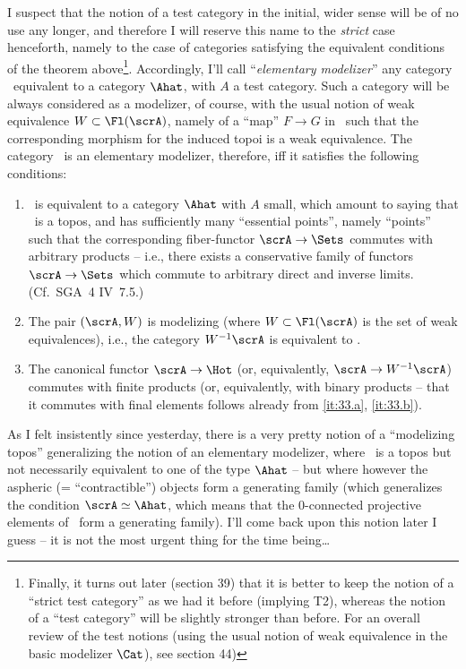 I suspect that the notion of a test category in the initial, wider
sense will be of no use any longer, and therefore I will reserve this
name to the \emph{strict} case henceforth, namely to the
case of categories satisfying the equivalent conditions of the theorem
above\footnote{Finally, it turns out later (section 39) that it is better to keep the notion of a ``strict test category'' as we had it before (implying T2), whereas the notion of a ``test category'' will be slightly stronger than before. For an overall review of the test notions (using the usual notion of weak equivalence in the basic modelizer $\Cat$), see section 44)}. Accordingly, I'll call ``\emph{elementary modelizer}'' any
category \scrA\ equivalent to a category $\Ahat$, with $A$ a test
category. Such a category will be always considered as a modelizer, of
course, with the usual notion of weak equivalence $W \subset
\Fl(\scrA)$, namely of a ``map'' $F \to G$ in \scrA\ such that the
corresponding morphism for the induced topoi is a weak
equivalence. The category \scrA\ is an elementary modelizer,
therefore, if{f} it satisfies the following conditions:
\begin{enumerate}[label=\alph*)]
\item\label{it:33.a}
  \scrA\ is equivalent to a category $\Ahat$ with $A$ small,
  which amount to saying that \scrA\ is a topos, and has sufficiently
  many ``essential points'', namely ``points'' such that the
  corresponding fiber-functor $\scrA \to \Sets$ commutes with
  arbitrary products -- i.e., there exists a conservative family of
  functors $\scrA\to\Sets$ which commute to arbitrary direct and
  inverse limits. (Cf.\ SGA~4 IV~7.5.)
\item\label{it:33.b}
  The pair $(\scrA,W)$ is modelizing (where $W \subset \Fl(\scrA)$ is
  the set of weak equivalences), i.e., the category $W^{-1}\scrA$ is
  equivalent to \Hot.
\item\label{it:33.c}
  The canonical functor $\scrA\to\Hot$ (or, equivalently, $\scrA\to
  W^{-1}\scrA$) commutes with finite products (or, equivalently, with
  binary products -- that it commutes with final elements follows
  already from \ref{it:33.a}, \ref{it:33.b}).
\end{enumerate}
As I felt insistently since yesterday, there is a very pretty notion
of a ``modelizing topos'' generalizing the notion of an elementary
modelizer, where \scrA\ is a topos but not necessarily equivalent to
one of the type $\Ahat$ -- but where however the aspheric (=
``contractible'') objects form a generating family (which generalizes
the condition $\scrA\simeq\Ahat$, which means that the
$0$-connected projective elements of \scrA\ form a generating
family). I'll come back upon this notion later I guess -- it is not
the most urgent thing for the time being\ldots

